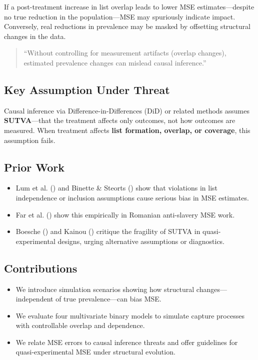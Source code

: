 \documentclass[
  12pt,
]{article}
\providecommand{\tightlist}{%
  \setlength{\itemsep}{0pt}\setlength{\parskip}{0pt}}\usepackage{longtable,booktabs,array}
\theoremstyle{plain}
\theoremstyle{definition}
\begin{document}
If a post-treatment increase in list overlap leads to lower MSE
estimates---despite no true reduction in the population---MSE may
spuriously indicate impact. Conversely, real reductions in prevalence
may be masked by offsetting structural changes in the data.

\begin{quote}
``Without controlling for measurement artifacts (overlap changes),
estimated prevalence changes can mislead causal inference.''
\end{quote}

\subsection{Key Assumption Under
Threat}\label{key-assumption-under-threat}

Causal inference via Difference-in-Differences (DiD) or related methods
assumes \textbf{SUTVA}---that the treatment affects only outcomes, not
how outcomes are measured. When treatment affects \textbf{list
formation, overlap, or coverage}, this assumption fails.

\subsection{Prior Work}\label{prior-work}

\begin{itemize}
\tightlist
\item
  Lum et al. () and Binette \&
  Steorts () show that violations
  in list independence or inclusion assumptions cause serious bias in
  MSE estimates.\\
\item
  Far et al. () show this empirically
  in Romanian anti-slavery MSE work.\\
\item
  Boesche () and Kainou
  () critique the fragility of SUTVA
  in quasi-experimental designs, urging alternative assumptions or
  diagnostics.
\end{itemize}

\subsection{Contributions}\label{contributions}

\begin{itemize}
\tightlist
\item
  We introduce simulation scenarios showing how structural
  changes---independent of true prevalence---can bias MSE.
\item
  We evaluate four multivariate binary models to simulate capture
  processes with controllable overlap and dependence.
\item
  We relate MSE errors to causal inference threats and offer guidelines
  for quasi-experimental MSE under structural evolution.
\end{itemize}
\end{document}
